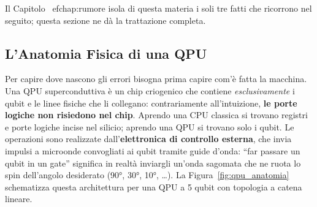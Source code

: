 
Il Capitolo~
ef{chap:rumore} isola di questa materia i soli tre fatti che ricorrono nel
seguito; questa sezione ne d\`a la trattazione completa.

\subsection{L'Anatomia Fisica di una QPU}

Per capire dove nascono gli errori bisogna prima capire com'è fatta la macchina. Una \ac{QPU} superconduttiva è un chip criogenico che contiene \emph{esclusivamente} i qubit e le linee fisiche che li collegano: contrariamente all'intuizione, \textbf{le porte logiche non risiedono nel chip}. Aprendo una CPU classica si trovano registri e porte logiche incise nel silicio; aprendo una QPU si trovano solo i qubit. Le operazioni sono realizzate dall'\textbf{elettronica di controllo esterna}, che invia impulsi a microonde convogliati ai qubit tramite guide d'onda: ``far passare un qubit in un gate'' significa in realtà inviargli un'onda sagomata che ne ruota lo spin dell'angolo desiderato (90°, 30°, 10°, \ldots). La Figura~\ref{fig:qpu_anatomia} schematizza questa architettura per una QPU a 5 qubit con topologia a catena lineare.

